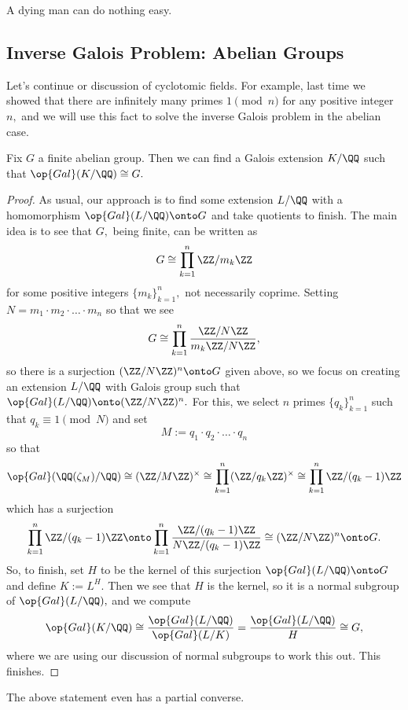 \documentclass[../notes.tex]{subfiles}
\begin{document}













A dying man can do nothing easy.

\subsection{Inverse Galois Problem: Abelian Groups}
Let's continue or discussion of cyclotomic fields. For example, last time we showed that there are infinitely many primes $1\pmod n$ for any positive integer $n,$ and we will use this fact to solve the inverse Galois problem in the abelian case.
\begin{proposition}
	Fix $G$ a finite abelian group. Then we can find a Galois extension $K/\QQ$ such that $\op{Gal}(K/\QQ)\cong G.$
\end{proposition}
\begin{proof}
	As usual, our approach is to find some extension $L/\QQ$ with a homomorphism $\op{Gal}(L/\QQ)\onto G$ and take quotients to finish. The main idea is to see that $G,$ being finite, can be written as
	\[G\cong\prod_{k=1}^n\ZZ/m_k\ZZ\]
	for some positive integers $\{m_k\}_{k=1}^n,$ not necessarily coprime. Setting $N=m_1\cdot m_2\cdot\ldots\cdot m_n$ so that we see
	\[G\cong\prod_{k=1}^n\frac{\ZZ/N\ZZ}{m_k\ZZ/N\ZZ},\]
	so there is a surjection $(\ZZ/N\ZZ)^n\onto G$ given above, so we focus on creating an extension $L/\QQ$ with Galois group such that $\op{Gal}(L/\QQ)\onto(\ZZ/N\ZZ)^n.$ For this, we select $n$ primes $\{q_k\}_{k=1}^n$ such that $q_k\equiv1\pmod N$ and set
	\[M:=q_1\cdot q_2\cdot\ldots\cdot q_n\]
	so that
	\[\op{Gal}(\QQ(\zeta_M)/\QQ)\cong(\ZZ/M\ZZ)^\times\cong\prod_{k=1}^n(\ZZ/q_k\ZZ)^\times\cong\prod_{k=1}^n\ZZ/(q_k-1)\ZZ\]
	which has a surjection
	\[\prod_{k=1}^n\ZZ/(q_k-1)\ZZ\onto\prod_{k=1}^n\frac{\ZZ/(q_k-1)\ZZ}{N\ZZ/(q_k-1)\ZZ}\cong(\ZZ/N\ZZ)^n\onto G.\]
	So, to finish, set $H$ to be the kernel of this surjection $\op{Gal}(L/\QQ)\onto G$ and define $K:=L^H.$ Then we see that $H$ is the kernel, so it is a normal subgroup of $\op{Gal}(L/\QQ),$ and we compute
	\[\op{Gal}(K/\QQ)\cong\frac{\op{Gal}(L/\QQ)}{\op{Gal}(L/K)}=\frac{\op{Gal}(L/\QQ)}H\cong G,\]
	where we are using our discussion of normal subgroups to work this out. This finishes.
\end{proof}
The above statement even has a partial converse.
\end{document}
